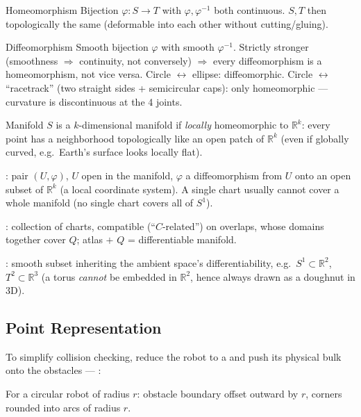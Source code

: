 \begin{defbox}{Homeomorphism}
Bijection $\varphi:S\to T$ with $\varphi,\varphi^{-1}$ both continuous. $S,T$ then topologically the same (deformable into each other without cutting/gluing).
\end{defbox}
\begin{defbox}{Diffeomorphism}
Smooth bijection $\varphi$ with smooth $\varphi^{-1}$. Strictly stronger (smoothness $\Rightarrow$ continuity, not conversely) $\Rightarrow$ every diffeomorphism is a homeomorphism, not vice versa. Circle $\leftrightarrow$ ellipse: diffeomorphic. Circle $\leftrightarrow$ ``racetrack'' (two straight sides + semicircular caps): only homeomorphic --- curvature is discontinuous at the 4 joints.
\end{defbox}
\begin{defbox}{Manifold}
$S$ is a $k$-dimensional manifold if \emph{locally} homeomorphic to $\mathbb{R}^k$: every point has a neighborhood topologically like an open patch of $\mathbb{R}^k$ (even if globally curved, e.g.\ Earth's surface looks locally flat).
\end{defbox}
: pair $(U,\varphi)$, $U$ open in the manifold, $\varphi$ a diffeomorphism from $U$ onto an open subset of $\mathbb{R}^k$ (a local coordinate system). A single chart usually cannot cover a whole manifold (no single chart covers all of $S^1$).

: collection of charts, compatible (``$C$-related'') on overlaps, whose domains together cover $Q$; atlas $+$ $Q$ = differentiable manifold.

: smooth subset inheriting the ambient space's differentiability, e.g.\ $S^1\subset\mathbb{R}^2$, $T^2\subset\mathbb{R}^3$ (a torus \emph{cannot} be embedded in $\mathbb{R}^2$, hence always drawn as a doughnut in 3D).

\subsection{Point Representation}

To simplify collision checking, reduce the robot to a  and push its physical bulk onto the obstacles --- :

For a circular robot of radius $r$: obstacle boundary offset outward by $r$, corners rounded into arcs of radius $r$.


